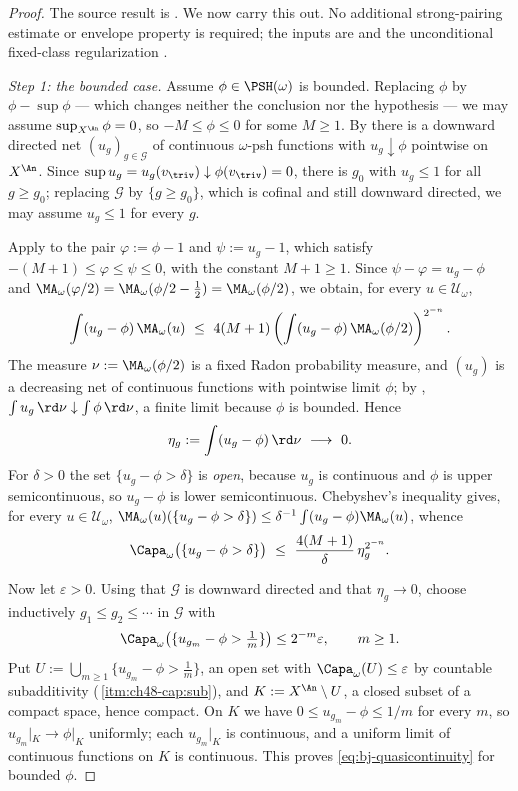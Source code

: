 \begin{proof}
The source result is \cite[Theorem~13.9 and Corollary~13.10]{BJ22}.
We now carry this out. No additional strong-pairing estimate or envelope
property is required; the inputs are  and the unconditional fixed-class
regularization .

\emph{Step 1: the bounded case.}  Assume $\phi\in\PSH(\omega)$ is
bounded.  Replacing $\phi$ by $\phi-\sup\phi$ --- which changes neither
the conclusion nor the hypothesis --- we may assume
$\sup_{X^{\An}}\phi=0$, so $-M\le\phi\le0$ for some $M\ge1$.
By  there is a downward directed
net $(u_g)_{g\in\mathcal G}$ of continuous $\omega$-psh functions with
$u_g\downarrow\phi$ pointwise on $X^{\An}$.  Since
$\sup u_g=u_g(v_{\triv})\downarrow\phi(v_{\triv})=0$, there is
$g_0$ with $u_{g}\le1$ for all $g\ge g_0$; replacing
$\mathcal G$ by $\{g\ge g_0\}$, which is cofinal and still downward
directed, we may assume $u_g\le1$ for every $g$.

Apply  to the pair
$\varphi:=\phi-1$ and $\psi:=u_g-1$, which satisfy
$-(M+1)\le\varphi\le\psi\le0$, with the constant $M+1\ge1$.  Since
$\psi-\varphi=u_g-\phi$ and
$\MA_\omega(\varphi/2)=\MA_\omega(\phi/2-\tfrac12)=\MA_\omega(\phi/2)$,
we obtain, for every $u\in\mathcal U_\omega$,
\[
 \int(u_g-\phi)\,\MA_\omega(u)
 \ \le\ 4(M+1)
   \left(\int(u_g-\phi)\,\MA_\omega(\phi/2)\right)^{2^{-n}} .
\]
The measure $\nu:=\MA_\omega(\phi/2)$ is a fixed Radon probability
measure, and $(u_g)$ is a decreasing net of continuous functions with
pointwise limit $\phi$; by
,
$\int u_g\,\rd\nu\downarrow\int\phi\,\rd\nu$, a finite limit because
$\phi$ is bounded.  Hence
\[
 \eta_g:=\int(u_g-\phi)\,\rd\nu\ \longrightarrow\ 0 .
\]
For $\delta>0$ the set $\{u_g-\phi>\delta\}$ is \emph{open}, because
$u_g$ is continuous and $\phi$ is upper semicontinuous, so
$u_g-\phi$ is lower semicontinuous.  Chebyshev's inequality gives, for
every $u\in\mathcal U_\omega$,
$\MA_\omega(u)(\{u_g-\phi>\delta\})\le\delta^{-1}\int(u_g-\phi)\MA_\omega(u)$,
whence
\[
 \Capa_\omega\bigl(\{u_g-\phi>\delta\}\bigr)
 \ \le\ \frac{4(M+1)}{\delta}\,\eta_g^{2^{-n}} .
\]

Now let $\varepsilon>0$.  Using that $\mathcal G$ is downward directed
and that $\eta_g\to0$, choose inductively
$g_1\le g_2\le\cdots$ in $\mathcal G$ with
\[
 \Capa_\omega\bigl(\{u_{g_m}-\phi>\tfrac1m\}\bigr)\le2^{-m}\varepsilon,
 \qquad m\ge1 .
\]
Put $U:=\bigcup_{m\ge1}\{u_{g_m}-\phi>\tfrac1m\}$, an open set with
$\Capa_\omega(U)\le\varepsilon$ by countable subadditivity
(\,\cref{itm:ch48-cap:sub}), and
$K:=X^{\An}\setminus U$, a closed subset of a compact space, hence
compact.  On $K$ we have $0\le u_{g_m}-\phi\le1/m$ for every $m$, so
$u_{g_m}|_K\to\phi|_K$ uniformly; each $u_{g_m}|_K$ is continuous, and a
uniform limit of continuous functions on $K$ is continuous.  This proves
\eqref{eq:bj-quasicontinuity} for bounded $\phi$.


\end{proof}
